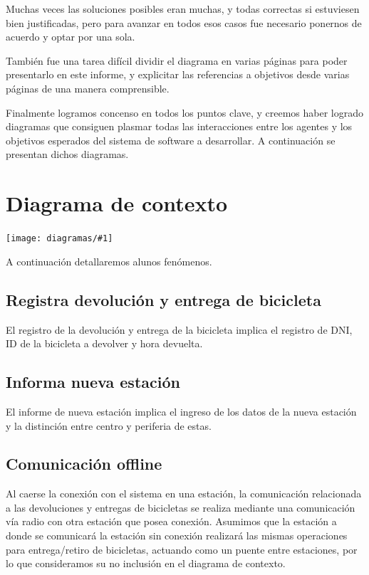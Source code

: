 \documentclass[a4paper, 10pt, twoside]{article}
\newcommand{\diagramah}[1]{
  \texttt{[image: diagramas/\#1]}
}
\begin{document}
Muchas veces las soluciones posibles eran muchas, y todas correctas si estuviesen bien justificadas, pero para avanzar en todos esos casos fue necesario ponernos de acuerdo y optar por una sola.

También fue una tarea difícil dividir el diagrama en varias páginas para poder presentarlo en este informe, y explicitar las referencias a objetivos desde varias páginas de una manera comprensible.

Finalmente logramos concenso en todos los puntos clave, y creemos haber logrado diagramas que consiguen plasmar todas las interacciones entre los agentes y los objetivos esperados del sistema de software a desarrollar. A continuación se presentan dichos diagramas.




\section{Diagrama de contexto}

\diagramah{contexto}

A continuación detallaremos alunos fenómenos.

\subsection{Registra devolución y entrega de bicicleta}

El registro de la devolución y entrega de la bicicleta implica el registro de DNI, ID de la bicicleta a devolver y hora devuelta.

\subsection{Informa nueva estación}

El informe de nueva estación implica el ingreso de los datos de la nueva estación y la distinción entre centro y periferia de estas.

\subsection{Comunicación offline}
Al caerse la conexión con el sistema en una estación, la comunicación relacionada a las devoluciones y entregas de bicicletas se realiza
mediante una comunicación vía radio con otra estación que posea conexión.
Asumimos que la estación a donde se comunicará la estación sin conexión realizará las mismas operaciones para entrega/retiro de bicicletas, actuando como un puente entre estaciones, por lo que consideramos su no inclusión en el diagrama de contexto.
\end{document}
